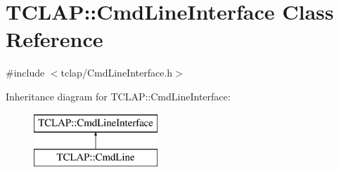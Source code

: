 \hypertarget{class_t_c_l_a_p_1_1_cmd_line_interface}{}\section{T\+C\+L\+A\+P\+:\+:Cmd\+Line\+Interface Class Reference}
\label{class_t_c_l_a_p_1_1_cmd_line_interface}


{\ttfamily \#include $<$tclap/\+Cmd\+Line\+Interface.\+h$>$}

Inheritance diagram for T\+C\+L\+A\+P\+:\+:Cmd\+Line\+Interface\+:\begin{figure}[H]
\begin{center}
\leavevmode
\includegraphics[height=2.000000cm]{class_t_c_l_a_p_1_1_cmd_line_interface}
\end{center}
\end{figure}
